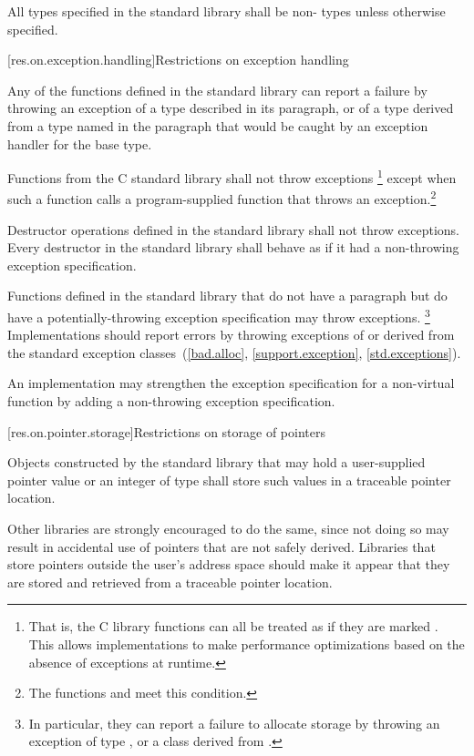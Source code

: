\pnum
All types specified in the \Cpp{} standard library shall be non- types
unless otherwise specified.

[res.on.exception.handling]{Restrictions on exception handling}%
%

\pnum
Any of the functions defined in the \Cpp{} standard library
%
can report a failure by throwing an exception of a type
described in its \throws paragraph,
or of a type derived from a type named in the \throws paragraph
that would be caught by an exception handler for the base type.

\pnum
Functions from the C standard library shall not throw exceptions%
\footnote{That is, the C
library functions can all be treated as if they
are marked .
This allows implementations to make performance optimizations
based on the absence of exceptions at runtime.}
except when such a function calls a program-supplied function that throws an
exception.\footnote{The functions
and
 meet this condition.}

\pnum
Destructor operations defined in the \Cpp{} standard library
shall not throw exceptions.
Every destructor in the \Cpp{} standard library shall behave as if it had a
non-throwing exception specification.

\pnum
Functions defined in the
\Cpp{} standard library
%
that do not have a \throws paragraph
but do have a potentially-throwing exception specification
may throw  exceptions.%
\footnote{In particular, they
can report a failure to allocate storage by throwing an exception of type
,
or a class derived from
.}
Implementations should
report errors by throwing exceptions of or derived
from the standard exception classes~(\ref{bad.alloc},
\ref{support.exception}, \ref{std.exceptions}).

\pnum
An implementation may strengthen the
exception specification
for a non-virtual function
by adding a non-throwing exception specification.

[res.on.pointer.storage]{Restrictions on storage of pointers}

\pnum
{}%
%
Objects constructed by the standard library that may hold a user-supplied pointer value
or an integer of type  shall store such values in a traceable
pointer location.
\begin{note}
Other libraries are
strongly encouraged to do the same, since not doing so may result in accidental use of
pointers that are not safely derived. Libraries that store pointers outside the user's
address space should make it appear that they are stored and retrieved from a traceable
pointer location.
\end{note}

